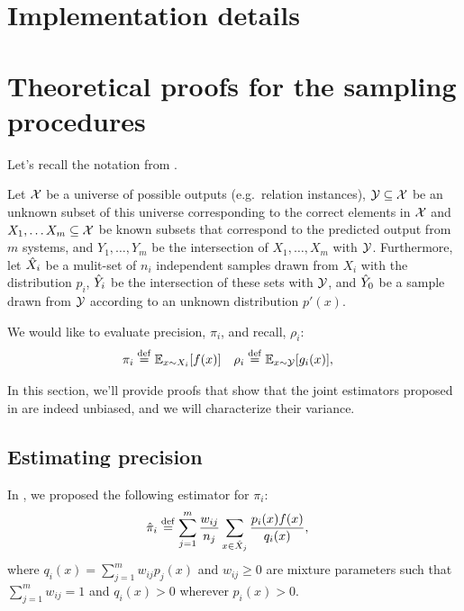 \onecolumn
\section{Implementation details}
\label{sec:implementation}

\section{Theoretical proofs for the sampling procedures}
\label{sec:sampling}

Let's recall the notation from .

Let $\mathcal{X}$ be a universe of possible outputs (e.g.\ relation instances),
  $\mathcal{Y} \subseteq \mathcal{X}$ be an unknown subset of this universe corresponding to the correct elements in $\mathcal{X}$ and
  $X_1, \ldots X_m \subseteq \mathcal{X}$ be known subsets that correspond to the predicted output from $m$ systems,
  and $Y_1, \ldots, Y_m$ be the intersection of $X_1, \ldots, X_m$ with $\mathcal{Y}$.
Furthermore, 
  let ${\hat{X}}_i$ be a mulit-set of $n_i$ independent samples drawn from $X_i$ with the distribution $p_i$,
  ${\hat{Y}}_i$ be the intersection of these sets with $\mathcal{Y}$, and
  ${\hat{Y}}_0$ be a sample drawn from $\mathcal{Y}$ according to an unknown distribution $p'(x)$.

We would like to evaluate precision, $\pi_i$, and recall, $\rho_i$:
\begin{align*}
  \pi_i  &\stackrel{\rm def}{=} \mathbb{E}_{x \sim X_i}[f(x)] &
  \rho_i &\stackrel{\rm def}{=} \mathbb{E}_{x \sim \mathcal{Y}}[g_i(x)],
\end{align*}

In this section, we'll provide proofs that show that the joint estimators proposed in  are indeed unbiased, and we will characterize their variance.

\subsection{Estimating precision}

In , we proposed the following estimator for $\pi_i$:
\begin{align*}
  {\hat{\pi}}_i &\stackrel{\rm def}{=} \sum_{j=1}^m \frac{w_{ij}}{n_j} \sum_{x \in {\hat{X}}_j} \frac{p_i(x) f(x)}{q_i(x)},
\end{align*}
where $q_i(x) = \sum_{j=1}^m w_{ij} p_j(x)$ and $w_{ij} \ge 0$ are mixture parameters such that $\sum_{j=1}^m w_{ij} = 1$ and $q_i(x) > 0$ wherever $p_i(x) > 0$.

